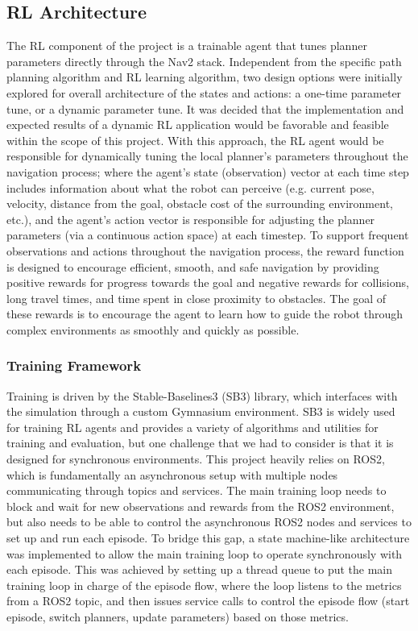 \documentclass[conference]{IEEEtran}
\begin{document}
    \subsection{RL Architecture}
    The RL component of the project is a trainable agent that tunes planner parameters directly through the Nav2 stack. Independent from the
    specific path planning algorithm and RL learning algorithm, two design options were initially explored for overall architecture of the states and actions: a one-time parameter tune, or a
    dynamic parameter tune. It was decided that the implementation and expected results of a dynamic RL application would be favorable and feasible within the scope of this project. With this approach, the RL agent would be responsible for dynamically tuning the local planner's parameters throughout the navigation process; where the agent's state (observation) vector at each time step includes information about what the robot can perceive (e.g. current pose, velocity, distance from the goal, obstacle cost of the surrounding environment, etc.), and the agent's action vector is responsible for adjusting the planner parameters (via a continuous action space) at each timestep. To support frequent observations and actions throughout the navigation process, the reward function is designed to encourage efficient, smooth, and safe navigation by providing positive rewards for progress towards the goal and negative rewards for collisions, long travel times, and time spent in close proximity to obstacles. The goal of these rewards is to encourage the agent to learn how to guide the robot through complex environments as smoothly and quickly as possible.

        \subsubsection{Training Framework}
        Training is driven by the Stable-Baselines3 (SB3) library, which interfaces with the simulation through a custom Gymnasium environment.
        SB3 is widely used for training RL agents and provides a variety of algorithms and utilities for training and evaluation, but one challenge that we had to
        consider is that it is designed for synchronous environments. This project heavily relies on ROS2, which is fundamentally an asynchronous setup with multiple
        nodes communicating through topics and services. The main training loop needs to block and wait for new observations and rewards from the ROS2 environment, but
        also needs to be able to control the asynchronous ROS2 nodes and services to set up and run each episode. To bridge this gap, a state machine-like architecture
        was implemented to allow the main training loop to operate synchronously with each episode. This was achieved by setting up a thread queue to put the main
        training loop in charge of the episode flow, where the loop listens to the metrics from a ROS2 topic, and then issues service calls to control the episode flow
        (start episode, switch planners, update parameters) based on those metrics.
        
\end{document}
